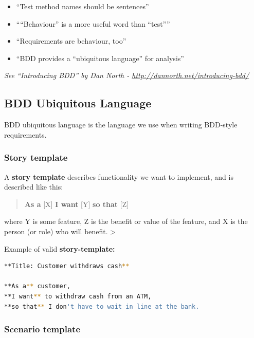 \begin{itemize}
\tightlist
\item
  ``Test method names should be sentences''
\item
  ````Behaviour'' is a more useful word than ``test''''
\item
  ``Requirements are behaviour, too''
\item
  ``BDD provides a ``ubiquitous language'' for analysis''
\end{itemize}

\emph{See ``Introducing BDD'' by Dan North -
\url{http://dannorth.net/introducing-bdd/}}

\hypertarget{bdd-ubiquitous-language}{%
\subsection{BDD Ubiquitous Language}\label{bdd-ubiquitous-language}}

BDD ubiquitous language is the language we use when writing BDD-style
requirements.

\hypertarget{story-template}{%
\subsubsection{Story template}\label{story-template}}

A \textbf{story template} describes functionality we want to implement,
and is described like this:

\begin{quote}
\textbf{As a} {[}X{]} \textbf{I want} {[}Y{]} \textbf{so that} {[}Z{]}
\end{quote}

where Y is some feature, Z is the benefit or value of the feature, and X
is the person (or role) who will benefit. \textgreater{}

Example of valid \textbf{story-template:}

\begin{lstlisting}[language=bash]
**Title: Customer withdraws cash**

**As a** customer,
**I want** to withdraw cash from an ATM,
**so that** I don't have to wait in line at the bank.
\end{lstlisting}

\hypertarget{scenario-template}{%
\subsubsection{Scenario template}\label{scenario-template}}

